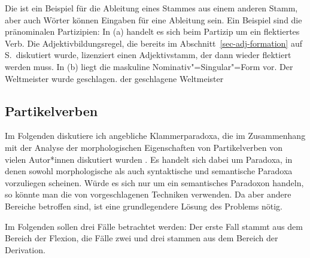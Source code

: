 \noindent
Die \bard ist ein Beispiel für die Ableitung eines Stammes aus einem anderen Stamm, aber auch Wörter
können Eingaben für eine Ableitung sein. Ein Beispiel sind die pränominalen Partizipien: In (a) handelt es sich
beim Partizip um ein flektiertes Verb. Die Adjektivbildungsregel, die bereits im Abschnitt~\ref{sec-adj-formation}
auf S.\,\pageref{lr-adjective-formation-da-approach} diskutiert wurde, lizenziert einen Adjektivstamm, der dann wieder
flektiert werden muss. In (b) liegt die maskuline Nominativ"=Singular"=Form vor.
\eal
\ex Der Weltmeister wurde geschlagen.
\ex der geschlagene Weltmeister
\zl
{}


\subsection{Partikelverben}
\label{morph-pv}

Im Folgenden diskutiere ich angebliche Klammerparadoxa, die im Zusammenhang mit der Analyse der
morphologischen Eigenschaften von Partikelverben von vielen Autor*innen diskutiert wurden
\parencites[z.\,B.][]{Bierwisch87a}[]{SW94a}[]{Stiebels96a}[104--105]{Luedeling2001a}. Es handelt sich
dabei um Paradoxa, in denen sowohl morphologische als auch syntaktische und semantische Paradoxa vorzuliegen
scheinen. Würde es sich nur um ein semantisches Paradoxon handeln, so könnte man die von \citet{Egg2004a}
vorgeschlagenen Techniken verwenden. Da aber andere Bereiche betroffen sind, ist eine grundlegendere Lösung
des Problems nötig.

Im Folgenden sollen drei Fälle betrachtet werden: Der erste Fall stammt aus dem Bereich der
Flexion, die Fälle zwei und drei stammen aus dem Bereich der Derivation.

